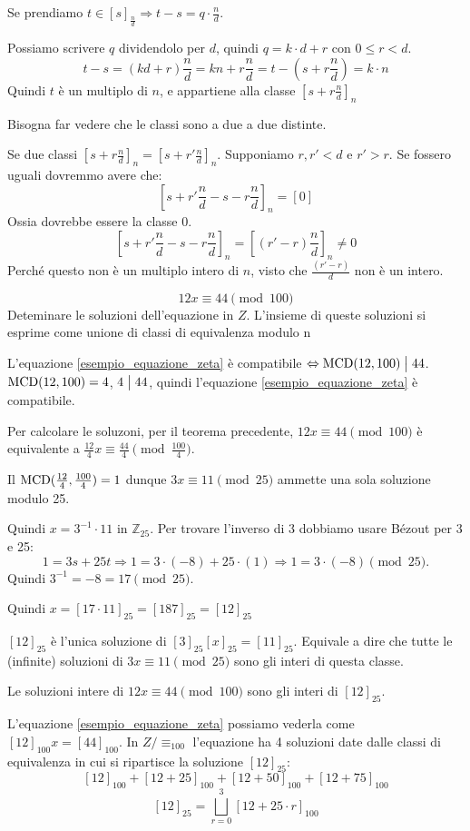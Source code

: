 Se prendiamo $t \in [s]_{\frac{n}{d}} \Rightarrow t - s = q \cdot \frac{n}{d}$.

Possiamo scrivere $q$ dividendolo per $d$, quindi $q = k \cdot d + r$ con $0 \le r < d$. 
\[
t - s = (k d + r) \frac{n}{d} = k n + r \frac{n}{d} = t - (s + r \frac{n}{d}) = k \cdot n
\]
Quindi $t$ \`e un multiplo di $n$, e appartiene alla classe $[s + r \frac{n}{d}]_n$

Bisogna far vedere che le classi sono a due a due distinte.

Se due classi $[s + r \frac{n}{d}]_n = [s + r' \frac{n}{d}]_n$. Supponiamo $r, r' < d$ e $r' > r$. Se fossero uguali dovremmo avere che:
\[
[s + r' \frac{n}{d} - s - r \frac{n}{d}]_n = [0] 
\]
Ossia dovrebbe essere la classe 0.
\[
[s + r' \frac{n}{d} - s - r \frac{n}{d}]_n = [(r' - r) \frac{n}{d}]_n \neq 0
\]
Perch\'e questo non \`e un multiplo intero di $n$, visto che $\frac{(r' - r)}{d}$ non \`e un intero.

\begin{exmp}
\begin{equation}\label{esempio_equazione_zeta}
12 x \equiv 44 \pmod{100}
\end{equation}
Deteminare le soluzioni dell'equazione in $Z$. L'insieme di queste soluzioni si esprime come unione di classi di equivalenza modulo n

L'equazione \ref{esempio_equazione_zeta} \`e compatibile $\Leftrightarrow \operatorname{MCD}(12, 100) \bigm| 44$. $\operatorname{MCD}(12, 100) = 4$, $4 \bigm| 44$, quindi l'equazione \ref{esempio_equazione_zeta} \`e compatibile.

Per calcolare le soluzoni, per il teorema precedente, $12 x \equiv 44 \pmod{100}$ \`e equivalente a $\frac{12}{4} x \equiv \frac{44}{4} \pmod{\frac{100}{4}}$.

Il $\operatorname{MCD}(\frac{12}{4}, \frac{100}{4}) = 1$ dunque $3 x \equiv 11 \pmod{25}$ ammette una sola soluzione modulo 25.

Quindi $x = 3^{-1} \cdot 11$ in $\mathbb{Z}_{25}$. Per trovare l'inverso di 3 dobbiamo usare B\'ezout per 3 e 25:
\[
1 = 3 s + 25 t \Rightarrow 1 = 3 \cdot (-8) + 25 \cdot (1) \Rightarrow
1 = 3 \cdot (-8) \pmod{25}.
\]
Quindi $3^{-1} = - 8 = 17 \pmod{25}$.

Quindi $x = [17 \cdot 11]_{25} = [187]_{25} = [12]_{25}$

$[12]_{25}$ \`e l'unica soluzione di $[3]_{25} [x]_{25} = [11]_{25}$. Equivale a dire che tutte le (infinite) soluzioni di $3 x \equiv 11 \pmod{25}$ sono gli interi di questa classe.

Le soluzioni intere di $12 x \equiv 44 \pmod{100}$ sono gli interi di $[12]_{25}$.

L'equazione \ref{esempio_equazione_zeta} possiamo vederla come $[12]_{100} x = [44]_{100}$. In $Z / \equiv_{100}$ l'equazione ha 4 soluzioni date dalle classi di equivalenza in cui si ripartisce la soluzione $[12]_{25}$:
\[
[12]_{100} + [12 + 25]_{100} + [12 + 50]_{100} + [12 + 75]_{100}
\]
\[
[12]_{25} = \bigsqcup_{r = 0}^{3} [12 + 25 \cdot r]_{100}
\]
\end{exmp}


